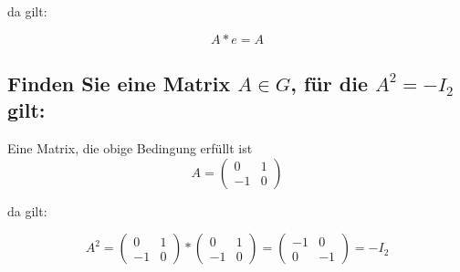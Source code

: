 \documentclass{article}
\begin{document}
da gilt:

\[A * e = A\]

\subsection*{Finden Sie eine Matrix \(A \in G\), für die \(A^2=-I_{2}\) gilt:}

Eine Matrix, die obige Bedingung erfüllt ist
\[
A =
\begin{pmatrix}
0 & 1 \\
-1 & 0
\end{pmatrix}
\]

da gilt:

\[
A^2
=
\begin{pmatrix}
0 & 1 \\
-1 & 0
\end{pmatrix}
*
\begin{pmatrix}
0 & 1 \\
-1 & 0
\end{pmatrix}
=
\begin{pmatrix}
-1 & 0 \\
0 & -1
\end{pmatrix}
= -I_{2}
\]
\end{document}
